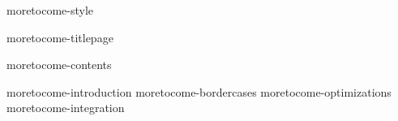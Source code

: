 

\environment moretocome-style

\dontcomplain

\startdocument

    \component moretocome-titlepage

    \startfrontmatter
        \component moretocome-contents
    \stopfrontmatter

    \startbodymatter
        \component moretocome-introduction
        \component moretocome-bordercases
        \component moretocome-optimizations
        \component moretocome-integration
    \stopbodymatter

\stopdocument
